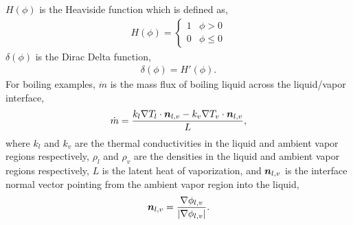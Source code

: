 \documentclass[]{article}
\newcommand{\bmn}{\mbox{\boldmath $n$\unboldmath}}
\begin{document}
\begin{itemize}
$H(\phi)$ is the Heaviside function which is defined as,
\begin{eqnarray*}
	H(\phi)=\left\{ \begin{array}{cc}
		1 & \phi>0  \\
  		0 & \phi\le 0 \end{array} 
	\right.
\end{eqnarray*}
$\delta(\phi)$ is the Dirac Delta function,
\begin{eqnarray*}
	\delta(\phi)=H'(\phi).
\end{eqnarray*}
For boiling examples,
$\dot{m}$ is the mass flux of boiling 
liquid across the liquid/vapor interface,
\begin{eqnarray*}
  \dot{m} = 
  \frac{k_{l}\nabla T_{l}\cdot \bmn_{l,v} - 
        k_{v}\nabla T_{v}\cdot \bmn_{l,v}}{L},
\end{eqnarray*}
where 
$k_{l}$ and $k_{v}$ are the thermal conductivities in the 
liquid and ambient vapor regions respectively, $\rho_{l}$ and
$\rho_{v}$ are the densities in the liquid and ambient vapor
regions respectively, $L$ is the latent heat of vaporization,
and $\bmn_{l,v}$ is the interface normal vector pointing from the
ambient vapor region into the liquid,
\begin{eqnarray*}
	\bmn_{l,v} = \frac{\nabla\phi_{l,v}}{|\nabla\phi_{l,v}|}.
\end{eqnarray*}



\end{itemize}
\end{document}
